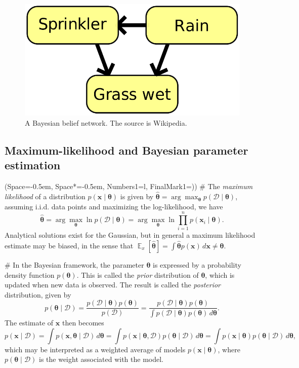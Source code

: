 \documentclass[12pt, a4paper]{article}
\newcommand{\listSpace}{-0.5em}%
\newcommand{\D}{\mathcal{D}}
\newcommand{\vect}[1]{\bm{#1}}
\DeclareMathOperator{\E}{\mathbb{E}}
\begin{document}
\begin{figure}[ht!]
\centering
\includegraphics[width=0.3\linewidth]{figs/bayesian_belief_network}
\caption{A Bayesian belief network. The source is Wikipedia.}
\label{fig:bayesian_belief_network}
\end{figure}




\subsection{Maximum-likelihood and Bayesian parameter estimation}
\begin{easylist}[itemize]
\ListProperties(Space=\listSpace, Space*=\listSpace, Numbers1=l, FinalMark1={)})
# The \emph{maximum likelihood} of a distribution $p(\vect{x} \mid \vect{\theta})$ is given by $\hat{\vect{\theta}} = \arg \max_{\vect{\theta}} p(\D \mid \vect{\theta})$,
assuming i.i.d. data points and maximizing the log-likelihood, we have
\begin{equation*}
	\hat{\vect{\theta}} = \arg \max_{\vect{\theta}} \ln  p(\D \mid \vect{\theta}) = \arg \max_{\vect{\theta}}  \ln  \prod_{i=1}^{n} p(\vect{x}_i \mid \vect{\theta})  .
\end{equation*}
Analytical solutions exist for the Gaussian, but in general a maximum likelihood estimate may be biased, in the sense that $\E_x[ \hat{\vect{\theta}} ] = \int \hat{\vect{\theta}} p(\vect{x}) \, d\vect{x} \neq \vect{\theta}$.

# In the Bayesian framework, the parameter $\vect{\theta}$ is expressed by a probability density function $p(\vect{\theta})$.
This is called the \emph{prior} distribution of $\vect{\theta}$, which is updated when new data is observed.
The result is called the \emph{posterior} distribution, given by
\begin{equation*}
	p(\vect{\theta} \mid \D)  
	= 
	\frac{p(\D \mid \vect{\theta}) p (\vect{\theta})}
	{p(\D)}
	= 
	\frac{p(\D \mid \vect{\theta}) p (\vect{\theta})}
	{\int p(\D \mid \vect{\theta}) p(\vect{\theta}) \, d \vect{\theta}}.
\end{equation*}
The estimate of $\vect{x}$ then becomes
\begin{equation*}
	p(\vect{x} \mid \D) = \int p(\vect{x}, \vect{\theta} \mid \D) \, d\vect{\theta} =
	\int p(\vect{x} \mid \vect{\theta} , \D) p(\vect{\theta} \mid \D)  \, d\vect{\theta} =
	\int p(\vect{x} \mid \vect{\theta}) p(\vect{\theta} \mid \D)  \, d\vect{\theta},
\end{equation*}
which may be interpreted as a weighted average of models $p(\vect{x} \mid \vect{\theta})$, where $p(\vect{\theta} \mid \D)$ is the weight associated with the model.


\end{easylist}
\end{document}
